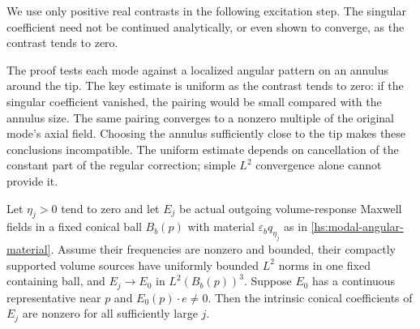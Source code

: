 We use only positive real contrasts in the following excitation step.
The singular coefficient need not be continued analytically, or even
shown to converge, as the contrast tends to zero.

The proof tests each mode against a localized angular pattern on an
annulus around the tip. The key estimate is uniform as the contrast tends
to zero: if the singular coefficient vanished, the pairing would be small
compared with the annulus size. The same pairing converges to a nonzero
multiple of the original mode's axial field. Choosing the annulus
sufficiently close to the tip makes these conclusions incompatible. The
uniform estimate depends on cancellation of the constant part of the
regular correction; simple $L^2$ convergence alone cannot provide it.

\begin{theorem}
\label{hs:modal-coefficient-continuation}
Let $\eta_j>0$ tend to zero and let $E_j$ be actual outgoing
volume-response Maxwell fields in a fixed conical ball $B_b(p)$ with material
$\varepsilon_bq_{\eta_j}$ as in \eqref{hs:modal-angular-material}.
Assume their frequencies are nonzero and bounded, their compactly
supported volume sources have uniformly bounded $L^2$ norms in one
fixed containing ball, and $E_j\to E_0$ in $L^2(B_b(p))^3$.
Suppose $E_0$ has a continuous representative near $p$ and
$E_0(p)\cdot e\ne0$.  Then the intrinsic conical coefficients of
$E_j$ are nonzero for all sufficiently large $j$.
\end{theorem}

